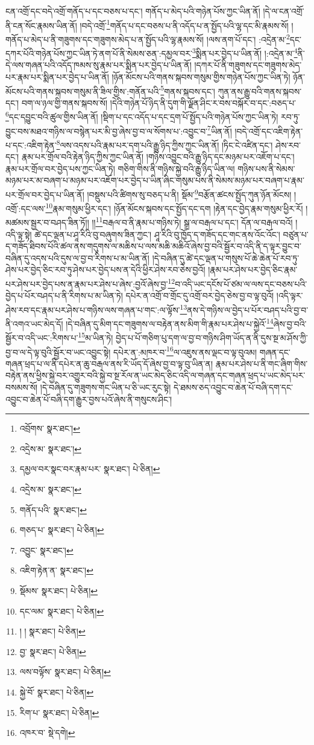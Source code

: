ངན་འགྲོ་དང་བདེ་འགྲོ་གནོད་པ་དང་བཅས་པ་དང་། གནོད་པ་མེད་པའི་གཉེན་པོས་ཀྱང་ཡིན་ནོ། །དེ་ལ་ངན་འགྲོ་ནི་ངན་སོང་རྣམས་ཡིན་ནོ། །བདེ་འགྲོ་\footnote{འབྲོགས་  སྣར་ཐང་། }གནོད་པ་དང་བཅས་པ་ནི་འདོད་པ་ན་སྤྱོད་པའི་ལྷ་དང་མི་རྣམས་སོ། །གནོད་པ་མེད་པ་ནི་གཟུགས་དང་གཟུགས་མེད་པ་ན་སྤྱོད་པའི་ལྷ་རྣམས་སོ། །ལས་ནག་པོ་དང་། :འདྲེན་མ་\footnote{འདྲེས་མ་  སྣར་ཐང་། }དང་དཀར་པོའི་གཉེན་པོས་ཀྱང་ཡིན་ཏེ་ནག་པོ་ནི་སེམས་ཅན་:དམྱལ་བར་\footnote{དམྱལ་བར་སྣང་བར་རྣམ་པར་  སྣར་ཐང་།  པེ་ཅིན། }སྨིན་པར་བྱེད་པ་ཡིན་ནོ། །:འདྲེན་མ་\footnote{འདྲེས་མ་  སྣར་ཐང་། }ནི་དེ་ལས་གཞན་པའི་འདོད་ཁམས་སུ་རྣམ་པར་སྨིན་པར་བྱེད་པ་ཡིན་ནོ། །དཀར་པོ་ནི་གཟུགས་དང་གཟུགས་མེད་པར་རྣམ་པར་སྨིན་པར་བྱེད་པ་ཡིན་ནོ། །ཉོན་མོངས་པའི་གནས་སྐབས་གསུམ་གྱིས་གཉེན་པོས་ཀྱང་ཡིན་ཏེ། ཉོན་མོངས་པའི་གནས་སྐབས་གསུམ་ནི་ཟིལ་གྱིས་:གནོན་པའི་\footnote{གནོད་པའི་  སྣར་ཐང་། }གནས་སྐབས་དང་། ཀུན་ནས་རྒྱུ་བའི་གནས་སྐབས་དང་། བག་ལ་ཉལ་གྱི་གནས་སྐབས་སོ། །དེའི་གཉེན་པོ་ཉིད་ནི་དུག་གི་ལྗོན་ཤིང་ར་བས་བསྐོར་བ་དང་:བཅད་པ་\footnote{གཅད་པ་  སྣར་ཐང་།  པེ་ཅིན། }དང་དབྱུང་བའི་ཚུལ་གྱིས་ཡིན་ནོ། །སྡིག་པ་དང་འདོད་པ་དང་དྲག་པོ་སྤྱོད་པའི་གཉེན་པོས་ཀྱང་ཡིན་ཏེ། རབ་ཏུ་བྱུང་བས་མཐའ་གཉིས་ལ་བསྙེན་པར་མི་བྱ་ཞེས་བྱ་བ་ལ་སོགས་པ་:འབྱུང་བ་\footnote{འབྱུང་  སྣར་ཐང་། }ཡིན་ནོ། །བདེ་འགྲོ་དང་འཇིག་རྟེན་པ་དང་:འཇིག་རྟེན་\footnote{འཇིག་རྟེན་ན་  སྣར་ཐང་། }ལས་འདས་པའི་རྣམ་པར་དག་པའི་རྒྱུ་ཉིད་ཀྱིས་ཀྱང་ཡིན་ནོ། །ཏིང་ངེ་འཛིན་དང་། ཤེས་རབ་དང་། རྣམ་པར་གྲོལ་བའི་རྟེན་ཉིད་ཀྱིས་ཀྱང་ཡིན་ནོ། །གཉིས་འབྱུང་བའི་རྒྱུ་ཉིད་དང་མཉམ་པར་འཇོག་པ་དང་། རྣམ་པར་གྲོལ་བར་བྱེད་པས་ཀྱང་ཡིན་ཏེ། གཅིག་གིས་ནི་གཉིས་སྐྱེ་བའི་རྒྱུ་ཉིད་ཡིན་ལ། གཉིས་པས་ནི་སེམས་མཉམ་པར་མ་བཞག་པ་མཉམ་པར་འཇོག་པར་བྱེད་པ་ཡིན་ཞིང་གསུམ་པས་ནི་སེམས་མཉམ་པར་བཞག་པ་རྣམ་པར་གྲོལ་བར་བྱེད་པ་ཡིན་ནོ། །བསྡུས་པའི་ཚིགས་སུ་བཅད་པ་ནི། སྡོམ་\footnote{སྡོམས་  སྣར་ཐང་།  པེ་ཅིན། }བརྩོན་ཚངས་སྤྱོད་ཀུན་ཉོན་མོངས། །འགྲོ་:དང་ལས་\footnote{དང་ལམ་  སྣར་ཐང་།  པེ་ཅིན། }རྣམ་གསུམ་ཕྱིར་དང་། །ཉོན་མོངས་སྐབས་དང་སྤྱོད་དང་དག །རྟེན་དང་བྱེད་རྣམ་གསུམ་ཕྱིར་རོ། །མཚམས་སྦྱར་བ་བཤད་ཟིན་ཏོ།། །།\footnote{། །  སྣར་ཐང་།  པེ་ཅིན། }བརྒལ་བ་ནི་རྣམ་པ་གཉིས་ཏེ། སྒྲ་ལ་བརྒལ་པ་དང་། དོན་ལ་བརྒལ་བའོ། །འདི་ལྟ་སྟེ། ཚེ་དང་ལྡན་པ་ཤཱ་རིའི་བུ་བཞུགས་ཟིན་ཀྱང་། ཤཱ་རིའི་བུ་ཁྱོད་ད་གཟོད་དང་གང་ནས་འོང་འོང་། བཙུན་པ་ད་གཟོད་ཐིབས་པོའི་ཚལ་ནས་གདུགས་ལ་མཆིས་པ་ལས་མཆི་མཆིའོ་ཞེས་བྱ་བའི་སྦྱོར་བ་འདི་ནི་ད་ལྟར་བྱུང་བ་བཞིན་དུ་འདས་པའི་དུས་ལ་བྱ་བ་རིགས་པ་མ་ཡིན་ནོ། །དེ་བཞིན་དུ་ཚེ་དང་ལྡན་པ་གསུས་པོ་ཆེ་ཆེན་པོ་རབ་ཏུ་ཤེས་པར་བྱེད་ཅིང་རབ་ཏུ་ཤེས་པར་བྱེད་པས་ན་དེའི་ཕྱིར་ཤེས་རབ་ཅེས་བྱའོ། །རྣམ་པར་ཤེས་པར་བྱེད་ཅིང་རྣམ་པར་ཤེས་པར་བྱེད་པས་ན་རྣམ་པར་ཤེས་པ་ཞེས་:བྱའོ་ཞེས་བྱ་\footnote{བྱ་  སྣར་ཐང་།  པེ་ཅིན། }བ་འདི་ཡང་དངོས་པོ་ཙམ་ལ་ལས་དང་བཅས་པའི་བྱེད་པ་པོར་བཤད་པ་ནི་རིགས་པ་མ་ཡིན་ཏེ། དཔེར་ན་འགྲོ་བ་གྲོང་དུ་འགྲོ་བར་བྱེད་ཅེས་བྱ་བ་ལྟ་བུའོ། །འདི་ལྟར་ཤེས་རབ་དང་རྣམ་པར་ཤེས་པ་གཉིས་ལས་གཞན་པ་གང་:ལ་ལྟོས་\footnote{ལས་བལྟོས་  སྣར་ཐང་།  པེ་ཅིན། }ནས་དེ་གཉིས་ལ་བྱེད་པ་པོར་བཤད་པའི་བྱ་བ་ནི་འགའ་ཡང་མེད་དོ། །དེ་བཞིན་དུ་མིག་དང་གཟུགས་ལ་བརྟེན་ནས་མིག་གི་རྣམ་པར་ཤེས་པ་སྐྱེའོ་\footnote{སྐྱེ་བོ་  སྣར་ཐང་།  པེ་ཅིན། }ཞེས་བྱ་བའི་སྦྱོར་བ་འདི་ཡང་:རིགས་པ་\footnote{རིག་པ་  སྣར་ཐང་།  པེ་ཅིན། }མ་ཡིན་ཏེ། བྱེད་པ་པོ་གཅིག་པུ་དག་ལ་བྱ་བ་གཉིས་ཤིག་ཡོད་ན་ནི་དུས་སྔ་མ་ཤོས་ཀྱི་བྱ་བ་ལ་དེ་ལྟ་བུའི་སྦྱོར་བ་ཡང་འབྱུང་སྟེ། དཔེར་ན་:མཁར་བ་\footnote{འཁར་བ་  སྡེ་དགེ། }ལ་འཇུས་ནས་ལྡང་བ་ལྟ་བུའམ། གཞན་དང་གཞན་ཕྲད་པ་ལ་ནི་དཔེར་ན་ཆུ་བརྒལ་ནས་རི་ཡོད་དོ་ཞེས་བྱ་བ་ལྟ་བུ་ཡིན་ན། རྣམ་པར་ཤེས་པ་ནི་གང་ཞིག་གིས་བརྟེན་ནས་ཕྱིས་སྐྱེ་བར་འགྱུར་བའི་སྐྱེ་བ་སྔ་རོལ་ན་ཡང་མེད་ཅིང་འདི་ལ་གཞན་དང་གཞན་ཕྲད་པ་ཡང་མེད་པར་བསམས་སོ། །དེ་བཞིན་དུ་གཟུགས་གང་ཡིན་པ་ཅི་ཡང་རུང་སྟེ། དེ་ཐམས་ཅད་འབྱུང་བ་ཆེན་པོ་བཞི་དག་དང་འབྱུང་བ་ཆེན་པོ་བཞི་དག་རྒྱུར་བྱས་པའོ་ཞེས་ནི་གསུངས་ཤིང་། 